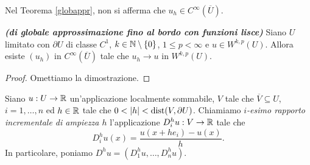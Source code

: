 \begin{osservazione}
	Nel Teorema \eqref{globappr}, non si afferma che $u_h \in C^\infty(\overline{U})$.
\end{osservazione}

\begin{teorema}\emph{\textbf{(di globale approssimazione fino al bordo con funzioni lisce)}}\label{globapprbordo}
	Siano $U$ limitato con $\partial U$ di classe $C^1$, $k \in \mathbb{N}\setminus\left\lbrace 0\right\rbrace $, $1\le p < \infty$ e $u \in W^{k,p}(U)$. Allora esiste $(u_h)$ in $C^\infty(\overline{U})$ tale che $u_h \to u$ in $W^{k,p}(U)$.
\end{teorema}
\begin{proof}
	Omettiamo la dimostrazione.
\end{proof}

\begin{definizione}
	Siano $u:U\to\mathbb{R}$ un'applicazione localmente sommabile, $V$ tale che $\overline{V} \subseteq U$, $i = 1,\dots,n$ ed $h \in \mathbb{R}$ tale che $0 < \lvert h\rvert< \textup{dist}(V,\partial U)$. Chiamiamo \emph{$i$-esimo rapporto incrementale di ampiezza $h$} l'applicazione $D_{i}^{h}u : V \to \mathbb{R}$ tale che
	\[D_{i}^{h}u(x) = \dfrac{u(x+he_i)- u(x)}{h}.\]
	In particolare, poniamo $ D^{h}u = \left( D^h_1u,\dots,D^h_nu\right)$.  
\end{definizione}


